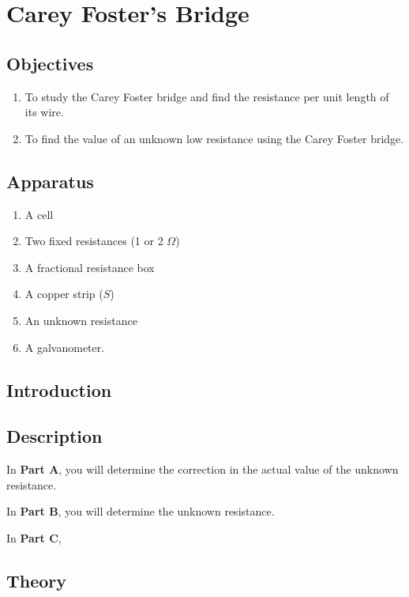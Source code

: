 \chapter{Carey Foster's Bridge}

\section*{Objectives}

\begin{enumerate}
\item To study the Carey Foster bridge and find the resistance per unit length of its wire. 
\item To find the value of an unknown low resistance using the Carey Foster bridge.
\end{enumerate}

\section*{Apparatus}

\begin{enumerate}[label=\arabic*)]
\itemsep0em
\item A cell
\item Two fixed resistances (1 or 2 $\Omega$)
\item A fractional resistance box
\item A copper strip ($S$)
\item An unknown resistance
\item A galvanometer.
\end{enumerate}

\section*{Introduction}






\section*{Description}

In \textbf{Part A}, you will determine the correction in the actual value of the unknown resistance.

In \textbf{Part B}, you will determine the unknown resistance.

In \textbf{Part C}, 



\section*{Theory}

